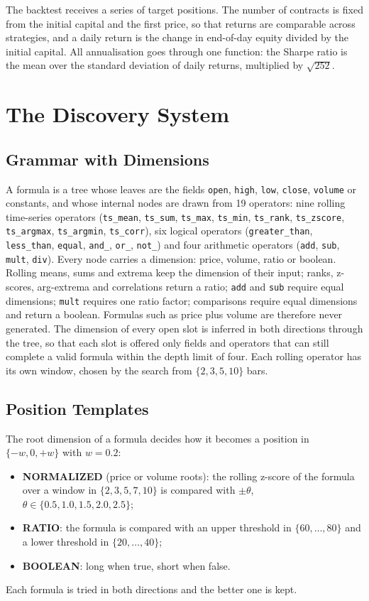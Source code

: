 \documentclass[12pt,a4paper,oneside]{book}
\theoremstyle{definition}
\newcommand{\code}[1]{\texttt{#1}}
\begin{document}
The backtest receives a series of target positions. The number of contracts is fixed from the initial capital and the first price, so that returns are comparable across strategies, and a daily return is the change in end-of-day equity divided by the initial capital. All annualisation goes through one function: the Sharpe ratio is the mean over the standard deviation of daily returns, multiplied by $\sqrt{252}$.

\section{The Discovery System}
\label{sec:system}

\subsection{Grammar with Dimensions}

A formula is a tree whose leaves are the fields \code{open}, \code{high}, \code{low}, \code{close}, \code{volume} or constants, and whose internal nodes are drawn from 19 operators: nine rolling time-series operators (\code{ts\_mean}, \code{ts\_sum}, \code{ts\_max}, \code{ts\_min}, \code{ts\_rank}, \code{ts\_zscore}, \code{ts\_argmax}, \code{ts\_argmin}, \code{ts\_corr}), six logical operators (\code{greater\_than}, \code{less\_than}, \code{equal}, \code{and\_}, \code{or\_}, \code{not\_}) and four arithmetic operators (\code{add}, \code{sub}, \code{mult}, \code{div}). Every node carries a dimension: price, volume, ratio or boolean. Rolling means, sums and extrema keep the dimension of their input; ranks, z-scores, arg-extrema and correlations return a ratio; \code{add} and \code{sub} require equal dimensions; \code{mult} requires one ratio factor; comparisons require equal dimensions and return a boolean. Formulas such as price plus volume are therefore never generated. The dimension of every open slot is inferred in both directions through the tree, so that each slot is offered only fields and operators that can still complete a valid formula within the depth limit of four. Each rolling operator has its own window, chosen by the search from $\{2, 3, 5, 10\}$ bars.

\subsection{Position Templates}

The root dimension of a formula decides how it becomes a position in $\{-w, 0, +w\}$ with $w = 0.2$:
\begin{itemize}
  \item \textbf{NORMALIZED} (price or volume roots): the rolling z-score of the formula over a window in $\{2,3,5,7,10\}$ is compared with $\pm\theta$, $\theta \in \{0.5, 1.0, 1.5, 2.0, 2.5\}$;
  \item \textbf{RATIO}: the formula is compared with an upper threshold in $\{60,\dots,80\}$ and a lower threshold in $\{20,\dots,40\}$;
  \item \textbf{BOOLEAN}: long when true, short when false.
\end{itemize}
Each formula is tried in both directions and the better one is kept.
\end{document}
